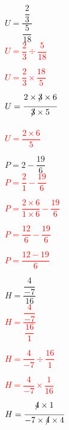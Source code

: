 \documentclass[a4paper,11pt]{article}
\begin{document}
$ U = \dfrac{\dfrac{2}{3}}{\dfrac{5}{18}}$\\

\textcolor{red} {$ U = \dfrac{2}{3} \div \dfrac{5}{18}$ \\}

\textcolor{red} {$ U = \dfrac{2}{3} \times \dfrac{18}{5}$ \\}

\textcolor{red} {$ U = \dfrac{2 \times\xout{ 3} \times 6}{\xout{3} \times 5}  $ \\}

\textcolor{red} {$ U = \dfrac{2 \times 6}{ 5}  $ \\}


\columnbreak

$P = 2 - \dfrac{19}{6}$\\

\textcolor{red} { $P = \dfrac{2}{1} - \dfrac{19}{6}$ \\}

\textcolor{red} { $P = \dfrac{2 \times 6}{1 \times 6} - \dfrac{19}{6}$ \\}

\textcolor{red} { $P = \dfrac{12}{6} - \dfrac{19}{6}$ \\}

\textcolor{red} { $P = \dfrac{12- 19}{6} $ \\}



$H = \dfrac{\dfrac{4}{-7}}{16}$\\

\textcolor{red} {$H = \dfrac{\dfrac{4}{-7}}{\dfrac{16}{1}}$\\}

\textcolor{red} {$H = \dfrac{4}{-7} \div \dfrac{16}{1}$\\}

\textcolor{red} {$H = \dfrac{4}{-7} \times \dfrac{1}{16}$\\}

\textcolor{red} {$H = \dfrac{\xout{4} \times 1}{-7 \times \xout{4} \times 4} $\\}

\end{document}
